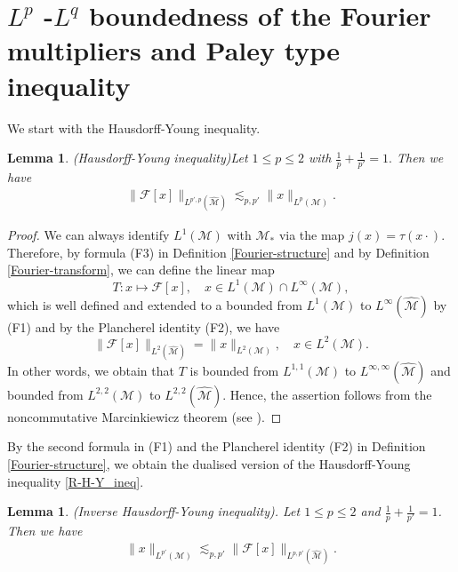 \documentclass[a4paper,12pt]{amsart}
\newtheorem{lem}[thm]{Lemma}
\numberwithin{equation}{section}
\theoremstyle{definition}
\begin{document}
\section{$L^p$ -$L^q$ boundedness of the Fourier multipliers and Paley type inequality}
 We start with the Hausdorff-Young inequality.
\begin{lem}(Hausdorff-Young inequality)\label{L.5.2} Let $1\leq p\leq2$ with $\frac{1}{p}+\frac{1}{p'}=1.$ Then we have
 \begin{eqnarray}\label{R-H-Y_ineq}
\|\mathcal{F}[x]\|_{L^{p',p}(\widehat{\mathcal{M}})} \lesssim_{p,p'}  \|x\|_{L^{p}(\mathcal{M} )}.
\end{eqnarray}
 \end{lem}
\begin{proof}We can always identify $L^1(\mathcal{M})$ with $\mathcal{M}_{*}$ via the map
$j(x)=\tau(x\cdot).$ Therefore, by formula (F3) in Definition \ref{Fourier-structure} and by Definition \ref{Fourier-transform},
we can define the linear map 
$$
T: x\mapsto \mathcal{F}[x], \quad x\in L^{1}(\mathcal{M})\cap L^{\infty}(\mathcal{M}),$$
which is well defined and extended to a bounded from $L^{1}(\mathcal{M})$ to $L^{\infty}(\widehat{\mathcal{M}})$ by (F1) and by the Plancherel identity (F2), we have    
\begin{equation*} 
\|\mathcal{F}[x]\|_{L^{2}(\widehat{\mathcal{M}})}=\|x\|_{L^{2}(\mathcal{M})},\quad x\in L^{2}(\mathcal{M}).
\end{equation*}
In other words, we obtain that $T$ is bounded from  $L^{1,1}(\mathcal{M})$ to $L^{\infty,\infty}(\widehat{\mathcal{M}})$ and bounded from $L^{2,2}(\mathcal{M})$ to $L^{2,2}(\widehat{\mathcal{M}}).$
 Hence, the assertion follows from the noncommutative Marcinkiewicz theorem (see \cite[Theorem 7.8.2, p. 434]{DPS}).  
\end{proof} 
By the second formula in (F1) and the Plancherel identity (F2) in Definition \ref{Fourier-structure}, we obtain the dualised version of the Hausdorff-Young inequality \eqref{R-H-Y_ineq}.
\begin{lem}\label{L.5.1} (Inverse Hausdorff-Young inequality). Let $1\leq{p}\leq2$  and $\frac{1}{p}+\frac{1}{p'}=1$. Then we have
\begin{eqnarray}\label{H-L_ineq}
\|x\|_{L^{p'}(\mathcal{M})}  \lesssim_{p,p'}   \|\mathcal{F}[x]\|_{L^{p,p'}(\widehat{\mathcal{M}})}.
\end{eqnarray}
\end{lem}
\end{document}

